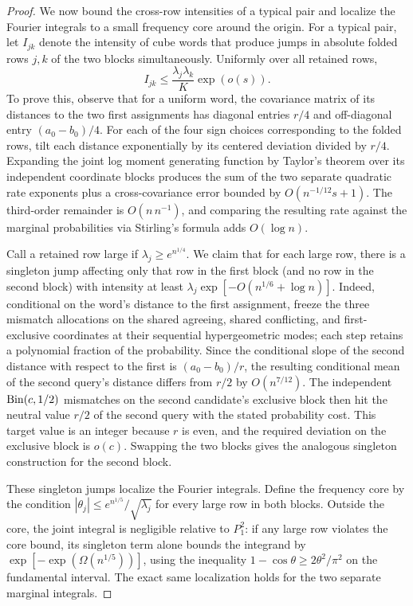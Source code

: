 \begin{proof}
We now bound the cross-row intensities of a typical pair and localize the Fourier integrals to a small frequency core around the origin. For a typical pair, let \(I_{jk}\) denote the intensity of cube words that produce jumps in absolute folded rows \(j,k\) of the two blocks simultaneously. Uniformly over all retained rows,
\[
 I_{jk}\le \frac{\lambda_j\lambda_k}{K}\exp(o(s)).
\]
To prove this, observe that for a uniform word, the covariance matrix of its distances to the two first assignments has diagonal entries \(r/4\) and off-diagonal entry \((a_0-b_0)/4\). For each of the four sign choices corresponding to the folded rows, tilt each distance exponentially by its centered deviation divided by \(r/4\). Expanding the joint log moment generating function by Taylor's theorem over its independent coordinate blocks produces the sum of the two separate quadratic rate exponents plus a cross-covariance error bounded by \(O(n^{-1/12}s+1)\). The third-order remainder is \(O(n\,n^{-1})\), and comparing the resulting rate against the marginal probabilities via Stirling's formula adds \(O(\log n)\).

Call a retained row large if \(\lambda_j\ge e^{n^{1/4}}\). We claim that for each large row, there is a singleton jump affecting only that row in the first block (and no row in the second block) with intensity at least \(\lambda_j\exp[-O(n^{1/6}+\log n)]\). Indeed, conditional on the word's distance to the first assignment, freeze the three mismatch allocations on the shared agreeing, shared conflicting, and first-exclusive coordinates at their sequential hypergeometric modes; each step retains a polynomial fraction of the probability. Since the conditional slope of the second distance with respect to the first is \((a_0-b_0)/r\), the resulting conditional mean of the second query's distance differs from \(r/2\) by \(O(n^{7/12})\). The independent \(\operatorname{Bin}(c,1/2)\) mismatches on the second candidate's exclusive block then hit the neutral value \(r/2\) of the second query with the stated probability cost. This target value is an integer because \(r\) is even, and the required deviation on the exclusive block is \(o(c)\). Swapping the two blocks gives the analogous singleton construction for the second block.

These singleton jumps localize the Fourier integrals. Define the frequency core by the condition \(|\theta_j|\le e^{n^{1/5}}/\sqrt{\lambda_j}\) for every large row in both blocks. Outside the core, the joint integral is negligible relative to \(P_1^2\): if any large row violates the core bound, its singleton term alone bounds the integrand by \(\exp[-\exp(\Omega(n^{1/5}))]\), using the inequality \(1-\cos\theta\ge2\theta^2/\pi^2\) on the fundamental interval. The exact same localization holds for the two separate marginal integrals.


\end{proof}
